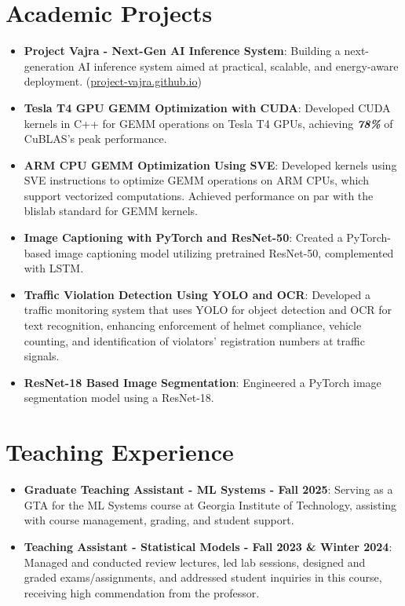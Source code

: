\documentclass[a4paper,20pt]{article}
\newcommand{\resumeItem}[2]{
  \item\small{
    \textbf{#1}{: #2 \vspace{-2pt}}
  }
}
\newcommand{\resumeSubItem}[2]{\resumeItem{#1}{#2}\vspace{-3pt}}
\newcommand{\resumeSubHeadingListStart}{\begin{itemize}[leftmargin=*]}
\newcommand{\resumeSubHeadingListEnd}{\end{itemize}}
\begin{document}
\vspace{-5pt}
\section{Academic Projects}
\resumeSubHeadingListStart
\resumeSubItem{Project Vajra - Next-Gen AI Inference System}{Building a next-generation AI inference system aimed at practical, scalable, and energy-aware deployment. (\href{https://project-vajra.github.io/}{project-vajra.github.io})}
\resumeSubItem{Tesla T4 GPU GEMM Optimization with CUDA}{Developed CUDA kernels in C++ for GEMM operations on Tesla T4 GPUs, achieving \textbf{\textit{78\%}} of CuBLAS's peak performance.}
\resumeSubItem{ARM CPU GEMM Optimization Using SVE}{Developed kernels using SVE instructions to optimize GEMM operations on ARM CPUs, which support vectorized computations. Achieved performance on par with the blislab standard for GEMM kernels.}
\resumeSubItem{Image Captioning with PyTorch and ResNet-50}{Created a PyTorch-based image captioning model utilizing pretrained ResNet-50, complemented with LSTM.}
\resumeSubItem{Traffic Violation Detection Using YOLO and OCR}{Developed a traffic monitoring system that uses YOLO for object detection and OCR for text recognition, enhancing enforcement of helmet compliance, vehicle counting, and identification of violators' registration numbers at traffic signals.}
\resumeSubItem{ResNet-18 Based Image Segmentation}{Engineered a PyTorch image segmentation model using a ResNet-18.}
\vspace{2pt}
\resumeSubHeadingListEnd
\vspace{-5pt}



\section{Teaching Experience}
\resumeSubHeadingListStart
\vspace{2pt}
\resumeSubItem{Graduate Teaching Assistant - ML Systems - Fall 2025} {Serving as a GTA for the ML Systems course at Georgia Institute of Technology, assisting with course management, grading, and student support.}
\vspace{2pt}
\resumeSubItem{Teaching Assistant - Statistical Models - Fall 2023 \& Winter 2024} {Managed and conducted review lectures, led lab sessions, designed and graded exams/assignments, and addressed student inquiries in this course, receiving high commendation from the professor.}
\vspace{2pt}
\resumeSubHeadingListEnd
\vspace{-5pt}
\end{document}
